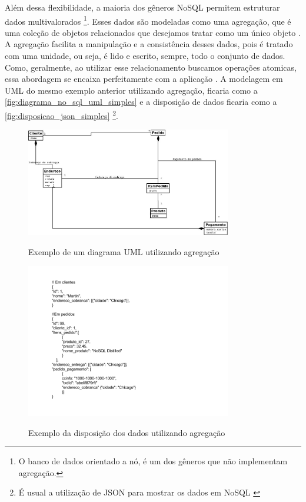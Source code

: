 Além dessa flexibilidade, a maioria dos gêneros NoSQL permitem estruturar dados multivalorados \footnote{O banco de dados orientado a nó, é um dos gêneros que não implementam agregação.}. Esses dados são modeladas como uma agregação, que é uma coleção de objetos relacionados que desejamos tratar como um único objeto \cite{domain-driven}. A agregação facilita a manipulação e a consistência desses dados, pois é tratado com uma unidade, ou seja, é lido e escrito, sempre, todo o conjunto de dados. Como, geralmente, ao utilizar esse relacionamento buscamos operações atomicas, essa abordagem se encaixa perfeitamente com a aplicação \cite{NoSQL}. A modelagem em \ac{UML} do mesmo exemplo anterior utilizando agregação, ficaria como a \autoref{fig:diagrama_no_sql_uml_simples} e a disposição de dados ficaria como a \autoref{fig:disposicao_json_simples} \footnote{É usual a utilização de JSON para mostrar os dados em NoSQL \cite{NoSQL}}.

\begin{figure}[H]
    \centering
    \caption{Exemplo de um diagrama \ac{UML} utilizando agregação}
    \includegraphics[width=0.8\textwidth]{./04-figuras/diagrama_no_sql_uml_simples.jpg}
    \label{fig:diagrama_no_sql_uml_simples}
\end{figure}
\begin{figure}[H]
    \centering
    \caption{Exemplo da disposição dos dados utilizando agregação}
    \includegraphics[width=0.8\textwidth]{./04-figuras/disposicao_json_simples.png}
    \label{fig:disposicao_json_simples}
\end{figure}



